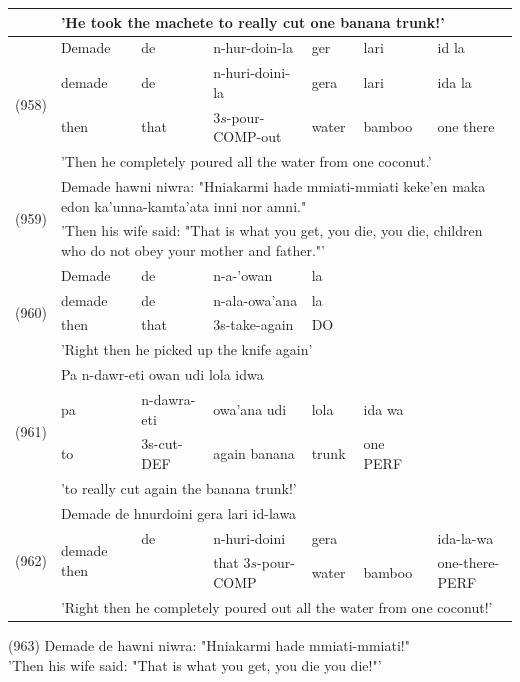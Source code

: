 \documentclass[10pt]{article}
\begin{document}
\begin{center}
\begin{tabular}{|l|l|l|l|l|l|l|}
\hline
 & \multicolumn{6}{|l|}{'He took the machete to really cut one banana trunk!'} \\
\hline
\multirow[t]{4}{*}{(958)} & Demade & de & n-hur-doin-la & ger & lari & id la \\
\hline
 & demade & de & n-huri-doini-la & gera & lari & ida la \\
\hline
 & then & that & \(3 s\)-pour-COMP-out & water & bamboo & one there \\
\hline
 & \multicolumn{6}{|l|}{'Then he completely poured all the water from one coconut.'} \\
\hline
\multirow[t]{2}{*}{(959)} & \multicolumn{6}{|l|}{Demade hawni niwra: "Hniakarmi hade mmiati-mmiati keke'en maka edon ka'unna-kamta'ata inni nor amni."} \\
\hline
 & \multicolumn{6}{|l|}{'Then his wife said: "That is what you get, you die, you die, children who do not obey your mother and father."'} \\
\hline
\multirow[t]{4}{*}{(960)} & Demade & de & n-a-'owan & la &  &  \\
\hline
 & demade & de & n-ala-owa'ana & la &  &  \\
\hline
 & then & that & 3s-take-again & DO &  &  \\
\hline
 & \multicolumn{6}{|l|}{'Right then he picked up the knife again'} \\
\hline
\multirow[t]{4}{*}{(961)} & \multicolumn{6}{|l|}{Pa n-dawr-eti owan udi lola idwa} \\
\hline
 & pa & n-dawra-eti & owa'ana udi & lola & ida wa &  \\
\hline
 & to & 3s-cut-DEF & again banana & trunk & one PERF &  \\
\hline
 & \multicolumn{6}{|l|}{'to really cut again the banana trunk!'} \\
\hline
\multirow[t]{4}{*}{(962)} & \multicolumn{6}{|l|}{Demade de hnurdoini gera lari id-lawa} \\
\hline
 & \multirow{2}{*}{demade then} & de & n-huri-doini & gera &  & ida-la-wa \\
\hline
 &  &  & that \(3 s\)-pour-COMP & water & bamboo & one-there-PERF \\
\hline
 & \multicolumn{6}{|l|}{'Right then he completely poured out all the water from one coconut!'} \\
\hline
\end{tabular}
\end{center}

(963) Demade de hawni niwra: "Hniakarmi hade mmiati-mmiati!"\\
'Then his wife said: "That is what you get, you die you die!"'
\end{document}
